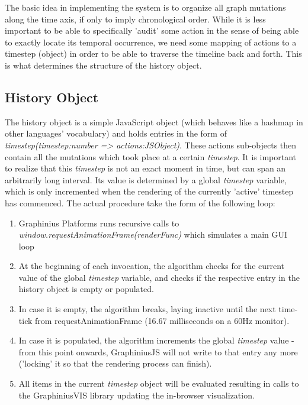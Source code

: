 	The basic idea in implementing the system is to organize all graph mutations along the time axis, if only to imply chronological order. While it is less important to be able to specifically 'audit' some action in the sense of being able to exactly locate its temporal occurrence, we need some mapping of actions to a timestep (object) in order to be able to traverse the timeline back and forth. This is what determines the structure of the history object.
	
	\subsection{History Object}
	\label{ssect:history_object}

	The history object is a simple JavaScript object (which behaves like a hashmap in other languages' vocabulary) and holds entries in the form of \textit{timestep(timestep:number => actions:JSObject)}. These actions sub-objects then contain all the mutations which took place at a certain \textit{timestep}. It is important to realize that this \textit{timestep} is not an exact moment in time, but can span an arbitrarily long interval. Its value is determined by a global \textit{timestep} variable, which is only incremented when the rendering of the currently 'active' timestep has commenced. The actual procedure take the form of the following loop:
	
	\begin{enumerate}
		\item Graphinius Platforms runs recursive calls to \textit{window.requestAnimationFrame(renderFunc)} which simulates a main GUI loop
		\item At the beginning of each invocation, the algorithm checks for the current value of the global \textit{timestep} variable, and checks if the respective entry in the history object is empty or populated.
		\item In case it is empty, the algorithm breaks, laying inactive until the next time-tick from requestAnimationFrame (16.67 milliseconds on a 60Hz monitor).
		\item In case it is populated, the algorithm increments the global \textit{timestep} value - from this point onwards, GraphiniusJS will not write to that entry any more ('locking' it so that the rendering process can finish).
		\item All items in the current \textit{timestep} object will be evaluated resulting in calls to the GraphiniusVIS library updating the in-browser visualization.
	\end{enumerate}
	
